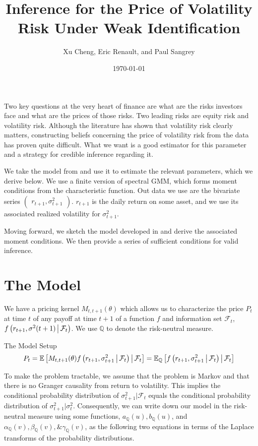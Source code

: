 \documentclass[11pt]{article}
\author{Xu Cheng, Eric Renault, and Paul Sangrey}
\title{Inference for the Price of Volatility Risk Under Weak Identification}
\date{\today}
\newcommand*{\F}{\mathcal{F}}
\newcommand*{\Q}{\mathbb{Q}}
\newcommand*{\E}{\mathbb{E}}
\newcommand{\mvert}[1][\middle]{\ensuremath{\,#1\vert\,}}
\begin{document}
\maketitle

Two key questions at the very heart of finance are what are the risks investors face and what are the prices of
those risks.
Two leading risks are equity risk and volatility risk.
Although the literature has shown that volatility risk clearly matters, constructing beliefs concerning the price
of volatility risk from the data has proven quite difficult.
What we want is a good estimator for this parameter and a strategy for credible inference regarding it.  

We take the model from \textcite{khrapov2016affine} and use it to estimate the relevant
parameters, which we derive below. 
We use a finite version of spectral GMM, which forms moment conditions from the characteristic function.
Out data we use are the bivariate series $\begin{pmatrix} r_{t+1}, \sigma^2_{t+1} \end{pmatrix}$.
$r_{t+1}$ is the daily return on some asset, and we use its associated realized volatility for $\sigma^2_{t+1}$.

Moving forward, we sketch the model developed in \textcite{khrapov2016affine} and derive the associated moment
conditions.
We then provide a series of sufficient conditions for valid inference. 

\section{The Model}

We have a pricing kernel $M_{t, t+1}(\theta)$ which allows us to characterize the price $P_t$ at time $t$ of any
payoff at time $t+1$ of a function $f$ and information set $\F_t$, $f\left(r_{t+1}, \sigma^2(t+1) \mvert
\F_t\right)$. 
We use $\Q$ to denote the risk-neutral measure.

\begin{defn}{The Model Setup}
    \begin{equation}
        P_t  = \E\left[M_{t,t+1}(\theta) f\left(r_{t+1}, \sigma^2_{t+1} \mvert  \F_t\right) \mvert \F_t \right] =
        \E_{\Q}\left[f\left(r_{t+1}, \sigma^2_{t+1} \mvert  \F_t\right) \mvert \F_t \right] 
    \end{equation}
\end{defn}

To make the problem tractable, we assume that the problem is Markov and that there is no Granger causality from
return to volatility. 
This implies the conditional probability distribution of $\sigma^2_{t+1} \vert \F_t$ equals the conditional
probability distribution of $\sigma^2_{t+1} \vert \sigma^2_t$.
Consequently, we can write down our model in the risk-neutral measure using some functions, $a_{\Q}(u),
b_{\Q}(u)$, and $\alpha_{\Q}(v), \beta_{\Q}(v), \& \gamma_{\Q}(v)$, as the following two equations in terms of the
Laplace transforms of the probability distributions.
\end{document}
